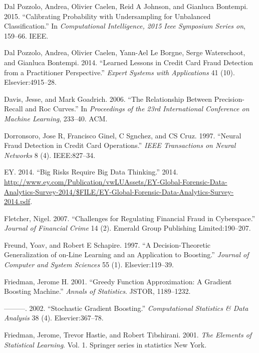\documentclass[12pt,]{article}
\begin{document}
\leavevmode\hypertarget{ref-dal2015calibrating}{}%
Dal Pozzolo, Andrea, Olivier Caelen, Reid A Johnson, and Gianluca
Bontempi. 2015. ``Calibrating Probability with Undersampling for
Unbalanced Classification.'' In \emph{Computational Intelligence, 2015
Ieee Symposium Series on}, 159--66. IEEE.

\leavevmode\hypertarget{ref-dal2014learned}{}%
Dal Pozzolo, Andrea, Olivier Caelen, Yann-Ael Le Borgne, Serge
Waterschoot, and Gianluca Bontempi. 2014. ``Learned Lessons in Credit
Card Fraud Detection from a Practitioner Perspective.'' \emph{Expert
Systems with Applications} 41 (10). Elsevier:4915--28.

\leavevmode\hypertarget{ref-davis2006relationship}{}%
Davis, Jesse, and Mark Goadrich. 2006. ``The Relationship Between
Precision-Recall and Roc Curves.'' In \emph{Proceedings of the 23rd
International Conference on Machine Learning}, 233--40. ACM.

\leavevmode\hypertarget{ref-dorronsoro1997neural}{}%
Dorronsoro, Jose R, Francisco Ginel, C Sgnchez, and CS Cruz. 1997.
``Neural Fraud Detection in Credit Card Operations.'' \emph{IEEE
Transactions on Neural Networks} 8 (4). IEEE:827--34.

\leavevmode\hypertarget{ref-analytics_tools_table}{}%
EY. 2014. ``Big Risks Require Big Data Thinking.'' 2014.
\url{http://www.ey.com/Publication/vwLUAssets/EY-Global-Forensic-Data-Analytics-Survey-2014/$FILE/EY-Global-Forensic-Data-Analytics-Survey-2014.pdf}.

\leavevmode\hypertarget{ref-fletcher2007challenges}{}%
Fletcher, Nigel. 2007. ``Challenges for Regulating Financial Fraud in
Cyberspace.'' \emph{Journal of Financial Crime} 14 (2). Emerald Group
Publishing Limited:190--207.

\leavevmode\hypertarget{ref-freund1997decision}{}%
Freund, Yoav, and Robert E Schapire. 1997. ``A Decision-Theoretic
Generalization of on-Line Learning and an Application to Boosting.''
\emph{Journal of Computer and System Sciences} 55 (1). Elsevier:119--39.

\leavevmode\hypertarget{ref-friedman2001greedy}{}%
Friedman, Jerome H. 2001. ``Greedy Function Approximation: A Gradient
Boosting Machine.'' \emph{Annals of Statistics}. JSTOR, 1189--1232.

\leavevmode\hypertarget{ref-friedman2002stochastic}{}%
---------. 2002. ``Stochastic Gradient Boosting.'' \emph{Computational
Statistics \& Data Analysis} 38 (4). Elsevier:367--78.

\leavevmode\hypertarget{ref-friedman2001elements}{}%
Friedman, Jerome, Trevor Hastie, and Robert Tibshirani. 2001. \emph{The
Elements of Statistical Learning}. Vol. 1. Springer series in statistics
New York.
\end{document}
